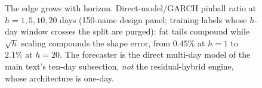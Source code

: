 \documentclass[11pt]{article}
\begin{document}
\clearpage
\begin{figure}[htbp]
\centering
{}
\caption{The edge grows with horizon. Direct-model/GARCH pinball
ratio at $h = 1, 5, 10, 20$ days (150-name design panel; training
labels whose $h$-day window crosses the split are purged): fat tails
compound while $\sqrt{h}$ scaling compounds the shape error, from $0.45\%$ at $h{=}1$ to $2.1\%$ at $h{=}20$. The forecaster is the
direct multi-day model of the main text's ten-day subsection,
\emph{not} the residual-hybrid engine, whose architecture is
one-day.}
\label{fig:horizon}
\end{figure}
\clearpage
\end{document}
